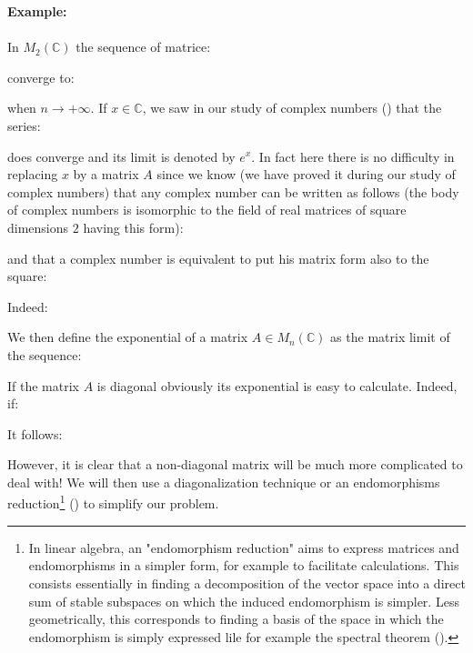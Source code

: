 	\begin{tcolorbox}[colframe=black,colback=white,sharp corners]
	\textbf{{\Large {}}Example:}\\\\
	In $M_2(\mathbb{C})$ the sequence of matrice:
	
	converge to:
	
	when $n\rightarrow +\infty$.
	If $x\in \mathbb{C}$, we saw in our study of complex numbers () that the series:	
	
	does converge and its limit is denoted by $e^x$. In fact here there is no difficulty in replacing $x$ by a matrix $A$ since we know (we have proved it during our study of complex numbers) that any complex number can be written as follows (the body of complex numbers is isomorphic to the field of real matrices of square dimensions $2$ having this form):
	
	\end{tcolorbox}
	\pagebreak
	\begin{tcolorbox}[colframe=black,colback=white,sharp corners]
	and that a complex number is equivalent to put his matrix form also to the square:
	
	Indeed:
	
	\end{tcolorbox}
	We then define the exponential of a matrix $A\in M_n(\mathbb{C})$ as the matrix limit of the sequence:
	
	If the matrix $A$ is diagonal obviously its exponential is easy to calculate. Indeed, if:
	
	It follows:
	
	However, it is clear that a non-diagonal matrix will be much more complicated to deal with! We will then use a diagonalization technique or an endomorphisms reduction\footnote{In linear algebra, an "endomorphism reduction" aims to express matrices and endomorphisms in a simpler form, for example to facilitate calculations. This consists essentially in finding a decomposition of the vector space into a direct sum of stable subspaces on which the induced endomorphism is simpler. Less geometrically, this corresponds to finding a basis of the space in which the endomorphism is simply expressed lile for example the spectral theorem ().} () to simplify our problem.
	
